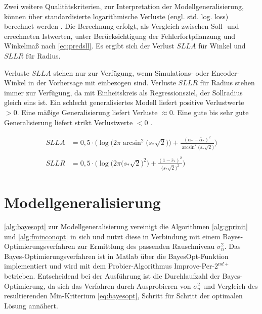Zwei weitere Qualitätskriterien, zur Interpretation der Modellgeneralisierung, können über standardisierte logarithmische Verluste (engl. std. log. loss) berechnet werden \cite{Rasmussen2006}. Die Berechnung erfolgt, als Vergleich zwischen Soll- und errechneten Istwerten, unter Berücksichtigung der Fehlerfortpflanzung und Winkelmaß nach \autoref{eq:predsll}. Es ergibt sich der Verlust $SLLA$ für Winkel und $SLLR$ für Radius.


\clearpage


Verluste $SLLA$ stehen nur zur Verfügung, wenn Simulations- oder Encoder-Winkel in der Vorhersage mit einbezogen sind. Verluste $SLLR$ für Radius stehen immer zur Verfügung, da mit Einheitskreis als Regressionsziel, der Sollradius gleich eins ist. Ein schlecht generalisiertes Modell liefert positive Verlustwerte $>0$. Eine mäßige Generalisierung liefert Verluste $\approx 0$. Eine gute bis sehr gute Generalisierung liefert strikt Verlustwerte $<0$ \cite{Rasmussen2006}.


\begin{align}\label{eq:predsll}
	SLLA &= 0,5 \cdot \bigg( \log \big( 2\pi \arcsin^2 \big( s_* \sqrt{2}) \big) + \frac{(\alpha_* - \bar{\alpha}_*)^2}{\arcsin^2 \big( s_* \sqrt{2} \big)}\bigg) \nonumber \\
	\\
	SLLR &= 0,5 \cdot \bigg( \log \big( 2\pi \big( s_* \sqrt{2} \big)^2 \big) + \frac{(1 - \bar{r}_*)^2}{\big( s_* \sqrt{2} \big)^2}\bigg) \nonumber
\end{align}


\section{Modellgeneralisierung}\label{sec:gprgen}


\autoref{alg:bayesopt} zur Modellgeneralisierung vereinigt die Algorithmen \ref{alg:gprinit} und \ref{alg:fminconopt} in sich und nutzt diese in Verbindung mit einem Bayes-Optimierungsverfahren zur Ermittlung des passenden Rauschniveau $\sigma_n^2$. Das Bayes-Optimierungsverfahren ist in Matlab über die BayesOpt-Funktion implementiert und wird mit dem Probier-Algorithmus Improve-Per-$2^{nd+}$ betrieben. Entscheidend bei der Ausführung ist die Durchlaufzahl der Bayes-Optimierung, da sich das Verfahren durch Ausprobieren von $\sigma_n^2$ und Vergleich des resultierenden Min-Kriterium \autoref{eq:bayesopt}, Schritt für Schritt der optimalen Lösung annähert. 


